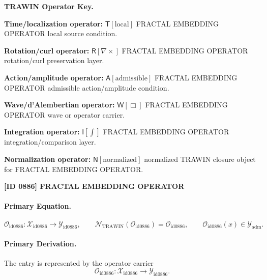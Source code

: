 \par\vspace{0.45\baselineskip}
\noindent\begin{minipage}[t]{\linewidth}
\begingroup
\small
\raggedright
\textbf{TRAWIN Operator Key.}\par
\noindent\textbf{Time/localization operator:} $\mathsf{T}\!\left[\mathrm{local}\right]$ FRACTAL EMBEDDING OPERATOR local source condition.\par
\noindent\textbf{Rotation/curl operator:} $\mathsf{R}\!\left[\nabla\times\right]$ FRACTAL EMBEDDING OPERATOR rotation/curl preservation layer.\par
\noindent\textbf{Action/amplitude operator:} $\mathsf{A}\!\left[\mathrm{admissible}\right]$ FRACTAL EMBEDDING OPERATOR admissible action/amplitude condition.\par
\noindent\textbf{Wave/d'Alembertian operator:} $\mathsf{W}\!\left[\Box\right]$ FRACTAL EMBEDDING OPERATOR wave or operator carrier.\par
\noindent\textbf{Integration operator:} $\mathsf{I}\!\left[\int\right]$ FRACTAL EMBEDDING OPERATOR integration/comparison layer.\par
\noindent\textbf{Normalization operator:} $\mathsf{N}\!\left[\mathrm{normalized}\right]$ normalized TRAWIN closure object for FRACTAL EMBEDDING OPERATOR.\par
\endgroup
\end{minipage}

\clearpage
\noindent\textbf{[ID 0886] FRACTAL EMBEDDING OPERATOR}\par
\vspace{0.35em}
\paragraph{Primary Equation.}
\[
\mathcal{O}_{\mathrm{id0886}}:\mathcal{X}_{\mathrm{id0886}}\longrightarrow \mathcal{Y}_{\mathrm{id0886}},\qquad
\mathcal{N}_{\mathrm{TRAWIN}}(\mathcal{O}_{\mathrm{id0886}})=\mathcal{O}_{\mathrm{id0886}},\qquad
\mathcal{O}_{\mathrm{id0886}}(x)\in\mathcal{Y}_{\mathrm{adm}}.
\]

\paragraph{Primary Derivation.} The entry is represented by the operator carrier\[
\mathcal{O}_{\mathrm{id0886}}:\mathcal{X}_{\mathrm{id0886}}\longrightarrow \mathcal{Y}_{\mathrm{id0886}}.
\]

